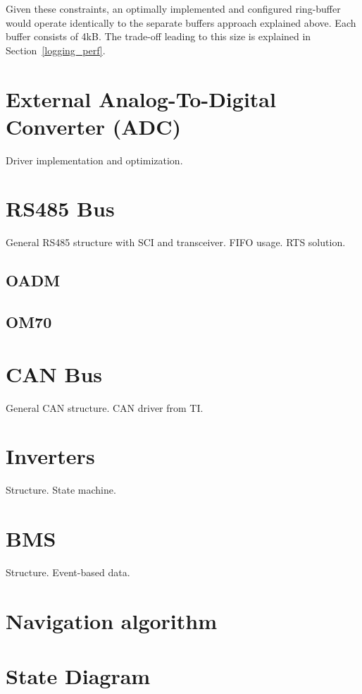Given these constraints, an optimally implemented and configured ring-buffer would operate identically to the separate buffers approach explained above. Each buffer consists of 4kB. The trade-off leading to this size is explained in Section~\ref{logging_perf}.

\section{External Analog-To-Digital Converter (ADC)}

Driver implementation and optimization.

\section{RS485 Bus}

General RS485 structure with SCI and transceiver. FIFO usage. RTS solution.

\subsection{OADM}

\subsection{OM70}

\section{CAN Bus}

General CAN structure. CAN driver from TI.

\section{Inverters}

Structure. State machine.

\section{BMS}

Structure. Event-based data.

\section{Navigation algorithm}

\section{State Diagram}

